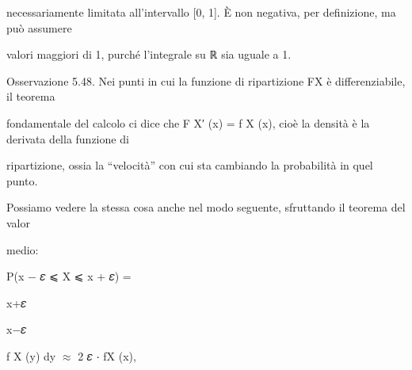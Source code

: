 \documentclass[a4paper,portrait,12pt]{article}
\begin{document}
\begin{flushleft}
necessariamente limitata all'intervallo [0, 1]. \`{E} non negativa, per definizione, ma pu\`{o} assumere
\end{flushleft}


\begin{flushleft}
valori maggiori di 1, purch\'{e} l'integrale su ℝ sia uguale a 1.
\end{flushleft}


\begin{flushleft}
Osservazione 5.48. Nei punti in cui la funzione di ripartizione FX \`{e} differenziabile, il teorema
\end{flushleft}


\begin{flushleft}
fondamentale del calcolo ci dice che F X′ (x) = f X (x), cio\`{e} la densit\`{a} \`{e} la derivata della funzione di
\end{flushleft}


\begin{flushleft}
ripartizione, ossia la {``}velocit\`{a}'' con cui sta cambiando la probabilit\`{a} in quel punto.
\end{flushleft}


\begin{flushleft}
Possiamo vedere la stessa cosa anche nel modo seguente, sfruttando il teorema del valor
\end{flushleft}


\begin{flushleft}
medio:
\end{flushleft}


\begin{flushleft}
P(x $-$ 𝜀 ⩽ X ⩽ x + 𝜀) =
\end{flushleft}





\begin{flushleft}
x+𝜀
\end{flushleft}





\begin{flushleft}
x$-$𝜀
\end{flushleft}





\begin{flushleft}
f X (y) dy $\approx$ 2 𝜀 ⋅ fX (x),
\end{flushleft}
\end{document}
